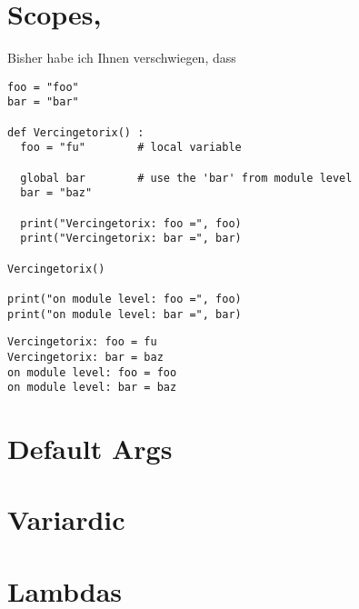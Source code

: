 \section{Scopes, }
Bisher habe ich Ihnen verschwiegen, dass 

\begin{codebox}
\begin{verbatim}
foo = "foo"
bar = "bar"

def Vercingetorix() :
  foo = "fu"        # local variable
  
  global bar        # use the 'bar' from module level
  bar = "baz"

  print("Vercingetorix: foo =", foo)
  print("Vercingetorix: bar =", bar)

Vercingetorix()

print("on module level: foo =", foo)
print("on module level: bar =", bar)
\end{verbatim}
\end{codebox}
\begin{cmdbox}
\begin{verbatim}
Vercingetorix: foo = fu
Vercingetorix: bar = baz
on module level: foo = foo
on module level: bar = baz
\end{verbatim}
\end{cmdbox}


\section{Default Args}
\section{Variardic}
\section{Lambdas}
